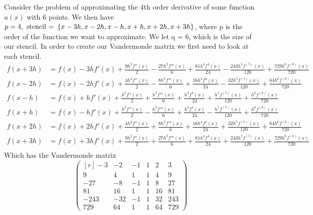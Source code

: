\begin{exmp}
    Consider the problem of approximating the 4th order derivative of some function $ u(x)
    $ with 6 points. We then have $ p = 4, \text{ stencil = } \set{ x-3h, x-2h, x-h, x+h,
    x+2h, x+3h}  $, where p is the order of the function we want to approximate. We let q
    = 6, which is the size of our stencil. In order to create our Vandermonde matrix we
    first need to look at each stencil.
    \begin{align*}
        f(x+3h) &= f(x) - 3hf'(x) + \frac{ 9h^2f''(x)  }{ 2 } - \frac{ 27h^3f'''(x)  }{ 6 } +
        \frac{ 81h^4f^{4}(x)  }{ 24 } - \frac{ 243h^5f^{(5)}(x)  }{ 120 } + \frac{
        729h^6f^{(6)}(x) }{ 720 }  \\ 
        f(x-2h) &= f(x) - 2hf'(x) + \frac{ 4h^2f''(x)  }{ 2 } - \frac{ 8h^3f'''(x)  }{ 6 } +
        \frac{ 16h^4f^{4}(x)  }{ 24 } - \frac{ 32h^5f^{(5)}(x)  }{ 120 } + \frac{
        64h^6f^{(6)}(x) }{ 720 }  \\ 
        f(x-h) &= f(x) + hf'(x) + \frac{ h^2f''(x)  }{ 2 } + \frac{ h^3f'''(x)  }{ 6 } +
        \frac{ h^4f^{4}(x)  }{ 24 } + \frac{ h^5f^{(5)}(x)  }{ 120 } + \frac{
        h^6f^{(6)}(x) }{ 720 }  \\ 
        f(x+h) &= f(x) - hf'(x) + \frac{ h^2f''(x)  }{ 2 } - \frac{ h^3f'''(x)  }{ 6 } +
        \frac{ h^4f^{4}(x)  }{ 24 } - \frac{ h^5f^{(5)}(x)  }{ 120 } + \frac{
        h^6f^{(6)}(x) }{ 720 }  \\ 
        f(x+2h) &= f(x) + 2hf'(x) + \frac{ 4h^2f''(x)  }{ 2 } + \frac{ 8h^3f'''(x)  }{ 6 } +
        \frac{ 16h^4f^{4}(x)  }{ 24 } + \frac{ 32h^5f^{(5)}(x)  }{ 120 } + \frac{
        64h^6f^{(6)}(x) }{ 720 }  \\ 
        f(x+3h) &= f(x) + 3hf'(x) + \frac{ 9h^2f''(x)  }{ 2 } + \frac{ 27h^3f'''(x)  }{ 6 } +
        \frac{ 81h^4f^{4}(x)  }{ 24 } + \frac{ 243h^5f^{(5)}(x)  }{ 120 } + \frac{
        729h^6f^{(6)}(x) }{ 720 }  \\ 
    \end{align*}
   Which has the Vandermonde matrix 
   \[
   \begin{pmatrix*}[r]
       -3& -2& -1& 1& 2& 3 \\
       9& 4& 1& 1& 4& 9   \\
       -27& -8& -1& 1& 8& 27  \\
       81& 16& 1& 1& 16& 81  \\
       -243& -32& -1& 1& 32& 243 \\
       729& 64& 1& 1& 64& 729 
   \end{pmatrix*}
\]
\end{exmp}
